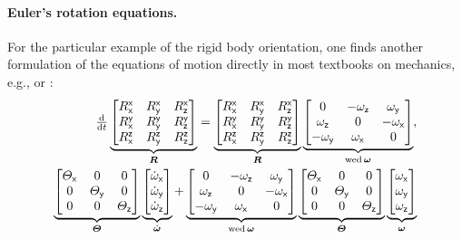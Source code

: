 \paragraph{Euler's rotation equations.}
For the particular example of the rigid body orientation, one finds another formulation of the equations of motion directly in most textbooks on mechanics, e.g., \cite[p.\,143]{Arnold:MathematicalMethodsOfClassicalMechanics} or \cite[p.\,145]{Schwertassek:MultibodySystems}:
\begin{subequations}\label{eq:ExampleEulerEq}
\begin{align}
 \ddt
 \underbrace{\begin{bmatrix} \Rxx & \Rxy & \Rxz \\ \Ryx & \Ryy & \Ryz \\ \Rzx & \Rzy & \Rzz \end{bmatrix}}_{\R}
 =
 \underbrace{\begin{bmatrix} \Rxx & \Rxy & \Rxz \\ \Ryx & \Ryy & \Ryz \\ \Rzx & \Rzy & \Rzz \end{bmatrix}}_{\R}
 \underbrace{\begin{bmatrix} 0 & -\wz & \wy \\ \wz & 0 & -\wx \\ -\wy & \wx & 0\end{bmatrix}}_{\wedOp{\w}},
\label{eq:ExampleEulerEqKinematics}
\\
 \underbrace{\begin{bmatrix} \Jx & 0 & 0 \\ 0 & \Jy & 0 \\ 0 & 0 & \Jz \end{bmatrix}}_{\J}
 \underbrace{\begin{bmatrix} \wxd \\ \wyd \\ \wzd \end{bmatrix}}_{\dot{\w}}
 + \underbrace{\begin{bmatrix} 0 & -\wz & \wy \\ \wz & 0 & -\wx \\ -\wy & \wx & 0\end{bmatrix}}_{\wedOp{\w}}
 \underbrace{\begin{bmatrix} \Jx & 0 & 0 \\ 0 & \Jy & 0 \\ 0 & 0 & \Jz \end{bmatrix}}_{\J}
 \underbrace{\begin{bmatrix} \wx \\ \wy \\ \wz \end{bmatrix}}_{\w}

\end{align}
\end{subequations}
